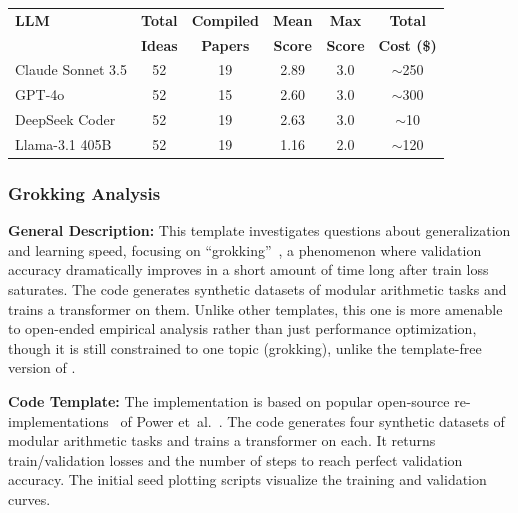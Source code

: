 \begin{appendices}
\begin{table}[!h]
\begin{tabular}{@{}l|c|c|c|c|c@{}}
\toprule
\textbf{LLM} & \textbf{Total} & \textbf{Compiled} & \textbf{Mean} & \textbf{Max} & \textbf{Total} \\
 & \textbf{Ideas} & \textbf{Papers} & \textbf{Score} & \textbf{Score} & \textbf{Cost (\$)} \\ \midrule
Claude Sonnet 3.5     & 52 & 19 & 2.89 & 3.0 & $\sim$250 \\
GPT-4o         & 52 &  15 & 2.60 & 3.0 & $\sim$300 \\
DeepSeek Coder & 52 &  19 & 2.63 & 3.0 & $\sim$10   \\
Llama-3.1 405B & 52 &  19 & 1.16 & 2.0 & $\sim$120 \\
\bottomrule
\end{tabular}

\end{table}


\subsubsection*{Grokking Analysis}
\textbf{General Description:} This template investigates questions about generalization and learning speed, focusing on ``grokking''~\citep{power2022grokking}, a phenomenon where validation accuracy dramatically improves in a short amount of time long after train loss saturates. The code generates synthetic datasets of modular arithmetic tasks and trains a transformer \cite{vaswani2017attention} on them. Unlike other templates, this one is more amenable to open-ended empirical analysis rather than just performance optimization, though it is still constrained to one topic (grokking), unlike the template-free version of \ouralgo.

\textbf{Code Template:} The implementation is based on popular open-source re-implementations~\citep{snell2021grokking, may2022grokking} of Power et~al.~\citep{power2022grokking}. The code generates four synthetic datasets of modular arithmetic tasks and trains a transformer on each. It returns train/validation losses and the number of steps to reach perfect validation accuracy. The initial seed plotting scripts visualize the training and validation curves.


\begin{table}[!h]
\centering
\caption{\textbf{Performance of the template-based version of \ouralgo for Grokking Analysis experiments.} Metrics as in .}
\label{tab:app_grokking_papers}


\end{table}
\end{appendices}
